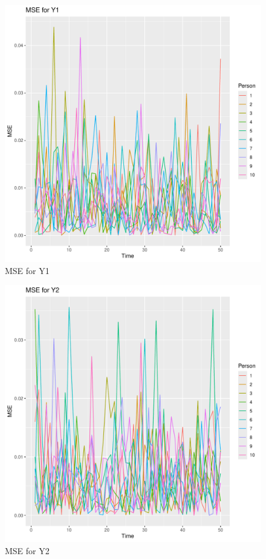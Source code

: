\documentclass{article}
\begin{document}
\begin{figure}[h]
  \centering
  \includegraphics[width=\textwidth]{mse_plot_y1.pdf}
  \caption{MSE for Y1}
\end{figure}

\begin{figure}[h]
  \centering
  \includegraphics[width=\textwidth]{mse_plot_y2.pdf}
  \caption{MSE for Y2}
\end{figure}
\end{document}
